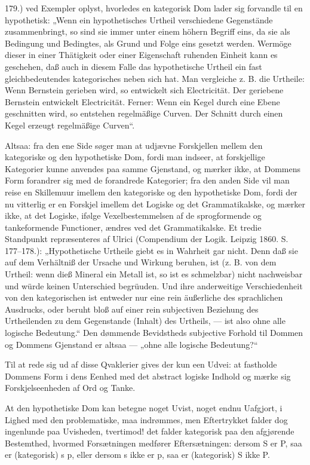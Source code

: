 \documentclass[12pt]{book}
\newcommand{\opage}[1]{\marginnote{\footnotesize\textit{[#1]}}}
\begin{document}
{179.) ved Exempler oplyst, hvorledes en kategorisk Dom lader sig
forvandle til en hypothetisk: „Wenn ein hypothetisches Urtheil verschiedene
Gegenstände zusammenbringt, so sind sie immer unter
einem höhern Begriff eins, da sie als Bedingung und Bedingtes,
als Grund und Folge eins gesetzt werden. Wermöge dieser in
einer Thätigkeit oder einer Eigenschaft ruhenden Einheit kann es
geschehen, daß auch in diesem Falle das hypothetische Urtheil ein fast
gleichbedeutendes kategorisches neben sich hat. Man vergleiche z. B.
die Urtheile: Wenn Bernstein gerieben wird, so entwickelt sich Electricität.
Der geriebene Bernstein entwickelt Electricität. Ferner:
Wenn ein Kegel durch eine Ebene geschnitten wird, so entstehen
regelmäßige Curven. Der Schnitt durch einen Kegel erzeugt regelmäßige
Curven“.

Altsaa: fra den ene Side søger man at udjævne Forskjellen
mellem den kategoriske og den hypothetiske Dom, fordi man indseer,
at forskjellige Kategorier kunne anvendes paa samme Gjenstand, og
mærker ikke, at Dommens Form forandrer sig med de forandrede
Kategorier; fra den anden Side vil man reise en Skillemuur imellem
den kategoriske og den hypothetiske Dom, fordi der nu vitterlig er
en Forskjel imellem det Logiske og det Grammatikalske, og mærker
ikke, at det Logiske, ifølge Vexelbestemmelsen af de sprogformende og
tankeformende Functioner, ændres ved det Grammatikalske. Et
tredie Standpunkt repræsenteres af Ulrici (Compendium der Logik.
Leipzig 1860. S. 177--178.): „Hypothetische Urtheile giebt es in
Wahrheit gar nicht. Denn daß sie auf dem Verhältniß der Ursache und
Wirkung beruhen, ist (z. B. von dem Urtheil: wenn dieß Mineral
ein Metall ist, so ist es schmelzbar) nicht nachweisbar und würde
keinen Unterschied begrüuden. Und ihre anderweitige Verschiedenheit
von den kategorischen ist entweder nur eine rein äußerliche des sprachlichen
Ausdrucks, oder beruht bloß auf einer rein subjectiven Beziehung
des Urtheilenden zu dem Gegenstande (Inhalt) des Urtheils,
--- ist also ohne alle logische Bedeutung.“ Den dømmende Bevidstheds
subjective Forhold til Dommen og Dommens Gjenstand
er altsaa --- „ohne alle logische Bedeutung?“

Til at rede sig ud af disse Qvaklerier gives der kun een Udvei:
at fastholde Dommens Form i dens Eenhed med det abstract
logiske Indhold og mærke sig Forskjelseenheden af Ord og Tanke.}
At den hypothetiske Dom kan betegne noget Uvist,
noget endnu Uafgjort, i Lighed med den problematiske, maa
\opage{63}indrømmes, men Eftertrykket falder dog ingenlunde paa Uvisheden,
tvertimod! det falder kategorisk paa den afgjørende Bestemthed,
hvormed Forsætningen medfører Eftersætningen: dersom
S er P, saa er (kategorisk) s p, eller dersom s ikke er
p, saa er (kategorisk) S ikke P.
\end{document}
